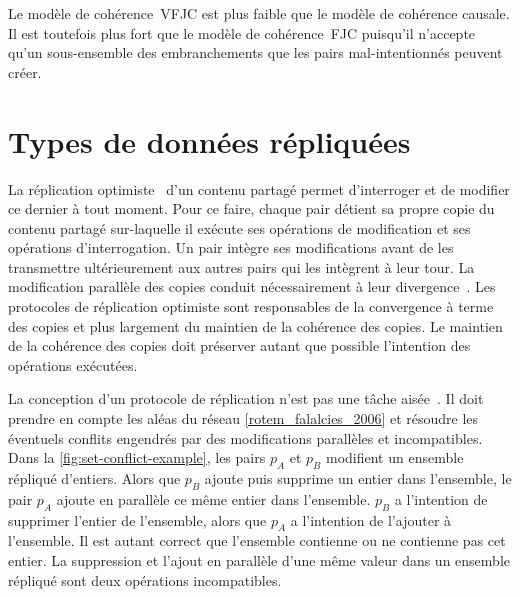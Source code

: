 Le modèle de cohérence~\ac{VFJC} est plus faible que le modèle de cohérence causale.
Il est toutefois plus fort que le modèle de cohérence~\ac{FJC} puisqu'il n'accepte qu'un sous-ensemble des embranchements que les pairs mal-intentionnés peuvent créer.




\clearpage %
\section{Types de données répliquées}\label{sec:crdt}

La réplication optimiste~\autocite{saito_2005_optimisticreplication} d'un contenu partagé permet d'interroger et de modifier ce dernier à tout moment.
Pour ce faire, chaque pair détient sa propre copie du contenu partagé sur-laquelle il exécute ses opérations de modification et ses opérations d'interrogation.
Un pair intègre ses modifications avant de les transmettre ultérieurement aux autres pairs qui les intègrent à leur tour.
La modification parallèle des copies conduit nécessairement à leur divergence~\autocite{dourish_1995_divergence}.
Les protocoles de réplication optimiste sont responsables de la convergence à terme des copies et plus largement du maintien de la cohérence des copies.
Le maintien de la cohérence des copies doit préserver autant que possible l'intention des opérations exécutées.

La conception d'un protocole de réplication n'est pas une tâche aisée~\autocite{oster2005_otisuues}.
Il doit prendre en compte les aléas du réseau \autoref{rotem_falalcies_2006} et résoudre les éventuels conflits engendrés par des modifications parallèles et incompatibles.
Dans la \autoref{fig:set-conflict-example}, les pairs $p_A$ et $p_B$ modifient un ensemble répliqué d'entiers.
Alors que $p_B$ ajoute puis supprime un entier dans l'ensemble, le pair $p_A$ ajoute en parallèle ce même entier dans l'ensemble.
$p_B$ a l'intention de supprimer l'entier de l'ensemble, alors que $p_A$ a l'intention de l'ajouter à l'ensemble.
Il est autant correct que l'ensemble contienne ou ne contienne pas cet entier.
La suppression et l'ajout en parallèle d'une même valeur dans un ensemble répliqué sont deux opérations incompatibles.


